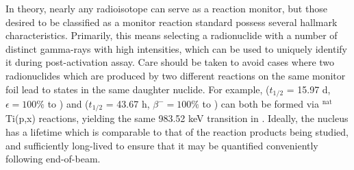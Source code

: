 \documentclass[3p]{elsarticle}
\newcommand{\comment}[1]{\todo[color=blue!20!white,inline]{ASV: #1}}
\begin{document}
In theory, nearly any radioisotope can serve as a reaction monitor, but those desired to be classified as a monitor reaction standard possess several hallmark characteristics.
Primarily, this means selecting a radionuclide with a number of distinct gamma-rays with high intensities,  which can be used to uniquely identify it during post-activation assay.  
Care should be taken to avoid cases where two radionuclides which are produced by two different reactions on the same monitor foil lead to states in the same daughter nuclide.  
For example,   ($t_{1/2}$ = 15.97 d, $\epsilon=100\%$ to ) and   ($t_{1/2}$ = 43.67 h, $\beta^-=100\%$ to ) can both be formed via $^\text{nat}$Ti(p,x) reactions, yielding the same 983.52 keV transition in  \cite{Burrows2006}.
Ideally, the nucleus has a lifetime which is comparable to that of the reaction products being studied, and sufficiently long-lived to ensure that it may be quantified  conveniently 
following end-of-beam.
\end{document}
